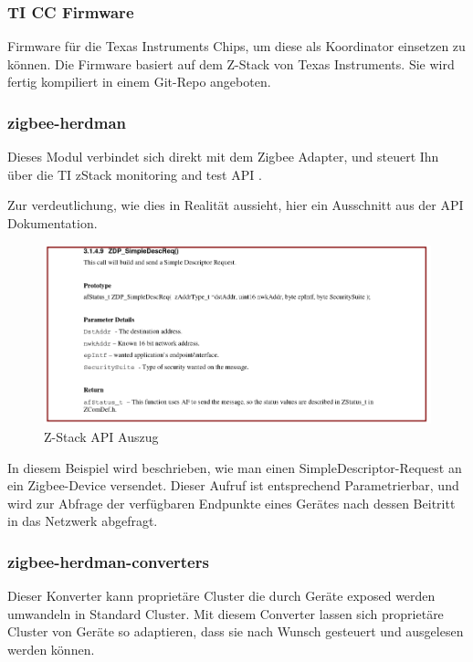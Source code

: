 \subsubsection{TI CC Firmware}

Firmware für die Texas Instruments Chips, um diese als Koordinator einsetzen zu können. Die Firmware basiert auf dem Z-Stack von Texas Instruments. Sie wird fertig kompiliert
in einem Git-Repo angeboten. 

\subsubsection{zigbee-herdman}

Dieses Modul verbindet sich direkt mit dem Zigbee Adapter, und steuert Ihn über die \grqq TI zStack monitoring and test API \grqq{}. \cite{zstack}

Zur verdeutlichung, wie dies in Realität aussieht, hier ein Ausschnitt aus der API Dokumentation.

\begin{figure}[H]
  \centering
  \includegraphics[width=1\textwidth]{media/z-stack-api-excerpt.png}
  \caption{Z-Stack API Auszug}
\end{figure}

In diesem Beispiel wird beschrieben, wie man einen SimpleDescriptor-Request an ein Zigbee-Device versendet. Dieser Aufruf ist entsprechend Parametrierbar,
und wird zur Abfrage der verfügbaren Endpunkte eines Gerätes nach dessen Beitritt in das Netzwerk abgefragt.

\subsubsection{zigbee-herdman-converters}

Dieser Konverter kann proprietäre Cluster die durch Geräte exposed werden umwandeln in Standard Cluster. Mit diesem Converter lassen sich proprietäre Cluster von Geräte
so adaptieren, dass sie nach Wunsch gesteuert und ausgelesen werden können.

